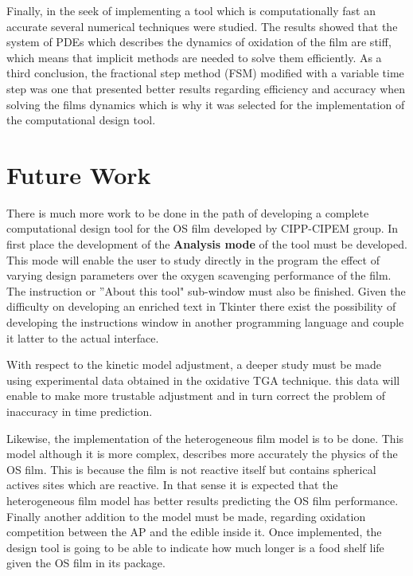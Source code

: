 Finally, in the seek  of implementing a tool which is computationally fast an accurate several numerical techniques were studied. The results showed that the system of PDEs which describes the dynamics of oxidation of the film are stiff, which means that implicit methods are needed to solve them efficiently. As a third conclusion, the fractional step method (FSM) modified with a variable time step was one that presented better results regarding efficiency and accuracy when solving the films dynamics which is why it was selected for the implementation of the computational design tool.
 
\section{Future Work}
There is much more work to be done in the path of developing a complete  computational design tool for the OS film developed by CIPP-CIPEM group. In first place the development of the \textbf{Analysis mode} of the tool must be developed. This mode will enable the user to study directly in the program the effect of varying design parameters over the oxygen scavenging performance of the film. The instruction or ''About this tool" sub-window must also be finished. Given the difficulty on developing an enriched text in Tkinter there exist the possibility of developing the instructions window in another  programming language and couple it latter to the actual interface.  

With respect to the kinetic model adjustment, a deeper study must be made using experimental data obtained in the oxidative TGA technique. this data will enable to make more trustable adjustment and in turn correct the problem of inaccuracy in time prediction. 

Likewise, the implementation of the heterogeneous film model is to be done. This model although it is more complex, describes more accurately the physics of the OS film. This is because the film is not reactive itself but contains spherical actives sites which are reactive. In that sense it is expected that the heterogeneous film model has better results predicting the OS film performance. Finally another addition to the model must be made, regarding oxidation competition between the AP and the edible inside it. Once implemented, the design tool is going to be able to indicate how much longer is a food  shelf life given the OS film in its package. 